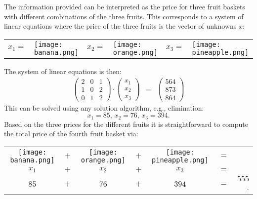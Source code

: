 \begin{solution}
The information provided can be interpreted as the price for three fruit baskets
with different combinations of the three fruits. This corresponds to a system of
linear equations where the price of the three fruits is the vector of unknowns $x$:
\begin{center}
\begin{tabular}{clclcl}
$x_1 =$ & \texttt{[image: banana.png]} & $x_2 =$ & \texttt{[image: orange.png]} & $x_3 =$ & \texttt{[image: pineapple.png]}
\end{tabular}
\end{center}
The system of linear equations is then:
\begin{eqnarray*}
\left( \begin{array}{rrr} 2 & 0 & 1 \\ 1 & 0 & 2 \\ 0 & 1 & 2 \end{array} \right) \cdot \left( \begin{array}{r} x_1 \\ x_2 \\ x_3 \end{array} \right) & = & \left( \begin{array}{r} 564 \\ 873 \\ 864 \end{array} \right)
\end{eqnarray*}
This can be solved using any solution algorithm, e.g., elimination:
$$
x_1 = 85, \, x_2 = 76, \, x_3 = 394.
$$
Based on the three prices for the different fruits it is straightforward to
compute the total price of the fourth fruit basket via:
\begin{center}
\begin{tabular}{ccccccr}
\texttt{[image: banana.png]} & $+$ & \texttt{[image: orange.png]} & $+$ & \texttt{[image: pineapple.png]} & $=$ & \\
$x_1$ & $+$ & $x_2$ & $+$ & $x_3$ & $=$ & \\
$85$ & $+$ & $76$ & $+$ & $394$ & $=$ & $555$.
\end{tabular}
\end{center}
\end{solution}



